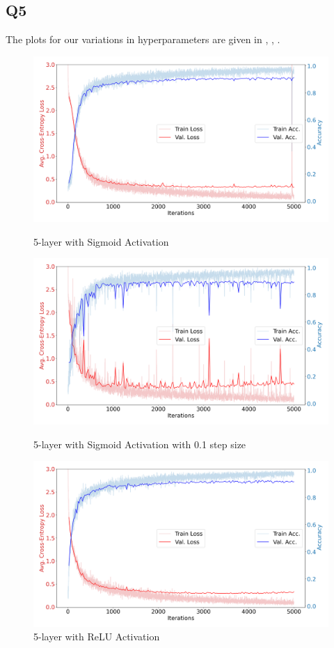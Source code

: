 \documentclass{article}
\theoremstyle{definition}
\begin{document}
    \subsection*{Q5}
        The plots for our variations in hyperparameters are given in , , .
            \begin{figure}[!htb]
                \includegraphics[width=\linewidth]{figures/5_1.png}
                \caption{5-layer with Sigmoid Activation}\label{fig:awesome_image1}
                \endminipage\hfill
                \includegraphics[width=\linewidth]{figures/5_2.png}
                \caption{5-layer with Sigmoid Activation with 0.1 step size}\label{fig:awesome_image2}
                \endminipage\hfill
                \includegraphics[width=\linewidth]{figures/5_3.png}
                \caption{5-layer with ReLU Activation}\label{fig:awesome_image3}
                \endminipage
            \end{figure}
\end{document}
